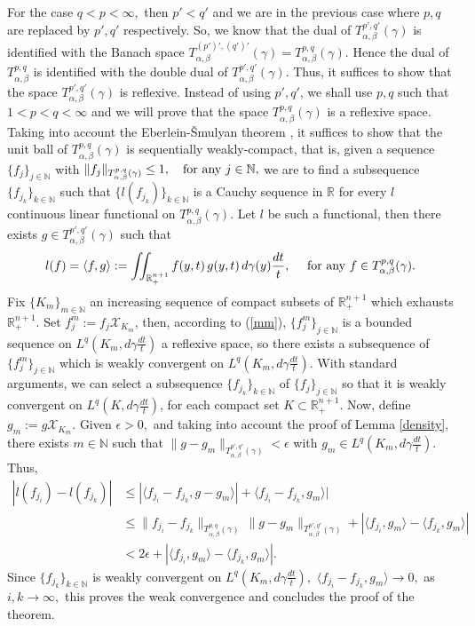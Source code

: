 \documentclass[leqno,11pt]{amsart}
\theoremstyle{plain}
\theoremstyle{remark}
\begin{document}
{ For the case $q<p<\infty,$ then $p'<q'$ and we are in the previous case where $p, q$ are replaced by $p', q'$ respectively. So, we know that the dual of $T^{p',q'}_{\alpha, \beta}(\gamma)$ is identified with the Banach space $T^{(p')', (q')'}_{\alpha, \beta}(\gamma)=T^{p,q}_{\alpha, \beta}(\gamma).$ Hence the dual of $T^{p,q}_{\alpha, \beta}$
 is identified with the double dual of $T^{p',q'}_{\alpha, \beta}(\gamma).$ Thus, it suffices to show that the space $T^{p',q'}_{\alpha, \beta}(\gamma)$ is reflexive. Instead of using $p', q'$, we shall use $p, q$ such that $1<p<q<\infty$ and we will prove that the space $T^{p,q}_{\alpha, \beta}(\gamma)$ is a reflexive space. Taking into account the Eberlein-\v{S}mulyan theorem \cite{yo},  
 it suffices to show that the unit ball of $T^{p,q}_{\alpha, \beta}(\gamma)$ is sequentially weakly-compact, that is, given a sequence $\{f_j\}_{j\in {\mathbb N}}$ with $\|f_j\|_{T^{p,q}_{\alpha,\beta}(\gamma)}\le 1,\ \ \hbox{ for any } j\in {\mathbb N},$ we are to find a subsequence $\{f_{j_k}\}_{k\in {\mathbb N}}$ such that $\{l(f_{j_k})\}_{k\in {\mathbb N}}$ is a Cauchy sequence in $\mathbb{R}$ for every $l$ continuous linear functional on $T^{p,q}_{\alpha, \beta}(\gamma).$ Let $l$ be such a functional, then there exists $g\in T^{p',q'}_{\alpha, \beta}(\gamma)$ such that 
 $$l(f)=\langle f, g\rangle:=\iint_{\mathbb{R}^{n+1}_+}f(y,t)\, g(y,t)\, d\gamma(y)\frac{dt}{t},\ \ \ \hbox{ for any } f\in T^{p,q}_{\alpha,\beta}(\gamma).$$ Fix $\{K_m\}_{m\in {\mathbb N}}$ an increasing sequence of compact subsets of $\mathbb{R}^{n+1}_+$ which exhausts $\mathbb{R}^{n+1}_+.$ Set $f_j^m:=f_j\mathcal{X}_{K_m}$, then, according to (\ref{mm}), 
 $\{f_j^m\}_{j\in {\mathbb N}}$ is a bounded sequence on $L^{q}(K_m,d\gamma\frac{dt}{t})$ a reflexive space, so there exists a subsequence of $\{f_j^m\}_{j\in {\mathbb N}}$ which is weakly convergent on $L^{q}(K_m, d\gamma\frac{dt}{t}).$ With standard arguments, we can select a subsequence $\{f_{j_k}\}_{k\in {\mathbb N}}$ of $\{f_j\}_{j\in {\mathbb N}}$ so that it is weakly convergent on $L^q(K,d\gamma\frac{dt}{t})$, for each compact set $K\subset \mathbb{R}^{n+1}_+.$ Now, 
 define $g_m:=g\mathcal{X}_{K_m}.$ Given $\epsilon>0,$ and taking into account the proof of Lemma \ref{density}, there exists $m\in {\mathbb N}$ such that $\|g-g_m\|_{T^{p',q'}_{\alpha, \beta}(\gamma)}<\epsilon$ with $g_m\in L^{q}(K_m,d\gamma\frac{dt}{t}).$ Thus,
 \begin{align*}
|l(f_{j_i})-l(f_{j_k})|&\le |\langle f_{j_i}-f_{j_k}, g-g_m\rangle |+\langle f_{j_i}-f_{j_k}, g_m\rangle|\\ &\le \|f_{j_i}-f_{j_k}\|_{T^{p,q}_{\alpha, \beta}(\gamma)}\, \|g-g_m\|_{T^{p',q'}_{\alpha, \beta}(\gamma)}+ |\langle f_{j_i}, g_m\rangle - \langle f_{j_k}, g_m\rangle |\\ &< 2\epsilon + 
|\langle f_{j_i}, g_m\rangle - \langle f_{j_k}, g_m\rangle |.
 \end{align*}
Since $\{f_{j_k}\}_{k\in {\mathbb N}}$ is weakly convergent on $L^{q}(K_m,d\gamma\frac{dt}{t}),$ $\langle f_{j_i}-f_{j_k},g_m\rangle \to 0,$ as $i,k\to \infty,$ this proves the weak convergence and concludes the proof of the theorem.
 
}
\end{document}
